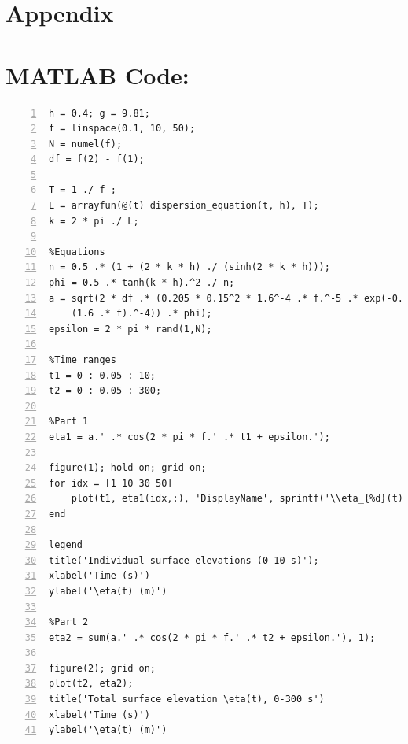 \documentclass[a4paper, 11pt]{article}
\begin{document}
\section{Appendix}

\section*{MATLAB Code:}
\begin{lstlisting}[frame=single, numbers=left, style=Matlab-Pyglike]
%Parameters
h = 0.4; g = 9.81;
f = linspace(0.1, 10, 50);
N = numel(f);
df = f(2) - f(1);

T = 1 ./ f ;
L = arrayfun(@(t) dispersion_equation(t, h), T);
k = 2 * pi ./ L;

%Equations
n = 0.5 .* (1 + (2 * k * h) ./ (sinh(2 * k * h)));
phi = 0.5 .* tanh(k * h).^2 ./ n;
a = sqrt(2 * df .* (0.205 * 0.15^2 * 1.6^-4 .* f.^-5 .* exp(-0.75 * ...
    (1.6 .* f).^-4)) .* phi);
epsilon = 2 * pi * rand(1,N);

%Time ranges
t1 = 0 : 0.05 : 10;
t2 = 0 : 0.05 : 300;

%Part 1
eta1 = a.' .* cos(2 * pi * f.' .* t1 + epsilon.');

figure(1); hold on; grid on;
for idx = [1 10 30 50]
    plot(t1, eta1(idx,:), 'DisplayName', sprintf('\\eta_{%d}(t)', idx));
end

legend
title('Individual surface elevations (0-10 s)');
xlabel('Time (s)')
ylabel('\eta(t) (m)')

%Part 2
eta2 = sum(a.' .* cos(2 * pi * f.' .* t2 + epsilon.'), 1);

figure(2); grid on;
plot(t2, eta2);
title('Total surface elevation \eta(t), 0-300 s')
xlabel('Time (s)')
ylabel('\eta(t) (m)')
\end{lstlisting}
\end{document}
